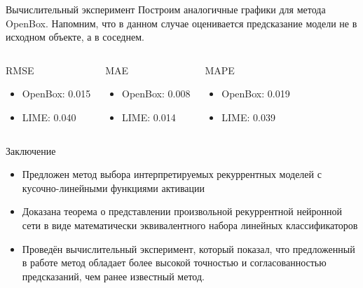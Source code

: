 \documentclass{beamer}
\begin{document}
\begin{frame}{Вычислительный эксперимент}
Построим аналогичные графики для метода OpenBox. Напомним, что в данном случае оценивается предсказание модели не в исходном объекте, а в соседнем.
\begin{columns}[c]


\end{columns}
\begin{columns}[c]
\begin{block}{RMSE}
\begin{itemize}
    \item OpenBox: 0.015
    \item LIME: 0.040
\end{itemize}
\end{block}
\begin{block}{MAE}
\begin{itemize}
    \item OpenBox: 0.008
    \item LIME: 0.014
\end{itemize}
\end{block}
\begin{block}{MAPE}
\begin{itemize}
    \item OpenBox: 0.019
    \item LIME: 0.039
\end{itemize}
\end{block}
\end{columns}

\end{frame}
\begin{frame}{Заключение}
    \begin{itemize}
        \item Предложен метод выбора интерпретируемых рекуррентных моделей с кусочно-линейными функциями активации
        \item Доказана теорема о представлении произвольной рекуррентной нейронной сети в виде математически эквивалентного набора линейных классификаторов
        \item Проведён вычислительный эксперимент, который показал, что предложенный в работе метод обладает более высокой точностью и согласованностью предсказаний, чем ранее известный метод.
    \end{itemize}
\end{frame}
\end{document}
